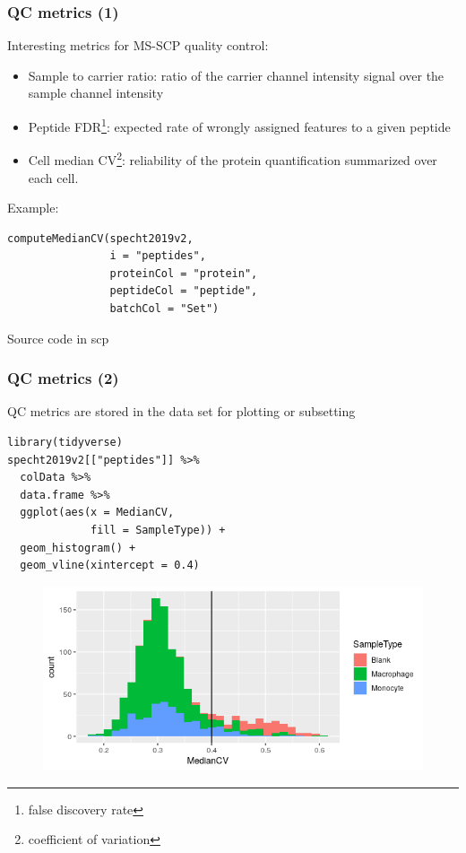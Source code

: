 \documentclass{beamer}
\newcommand{\hcode}[2][lgray]{{\ttfamily\color{vdgray}\colorbox{#1}{#2}}}
\newcommand{\frametitlesection}[1]{\frametitle{\centering #1 \footnotesize \hspace{0pt plus 1 filll} \insertsection}}
\begin{document}
\begin{frame}[fragile]
    \frametitlesection{QC metrics (1)}
    \small
    Interesting metrics for MS-SCP quality control: 
    
    \begin{itemize}
        \item{Sample to carrier ratio}: ratio of the carrier channel intensity 
        signal over the sample channel intensity
        \item{Peptide FDR\footnote{false discovery rate}: expected rate of 
        wrongly assigned features to a given peptide}
        \item{Cell median CV\footnote{coefficient of variation}: reliability of 
        the protein quantification summarized over each cell.}
    \end{itemize}
    
    Example:

    \begin{lstlisting}
computeMedianCV(specht2019v2,
                i = "peptides", 
                proteinCol = "protein", 
                peptideCol = "peptide", 
                batchCol = "Set")
    \end{lstlisting}
    
    Source code in \hcode{scp}
    
\end{frame}


\begin{frame}[fragile]
    \frametitlesection{QC metrics (2)}

    QC metrics are stored in the data set for plotting or subsetting
    
    \begin{lstlisting}[basicstyle = \scriptsize\ttfamily\color{vdgray}]
library(tidyverse)
specht2019v2[["peptides"]] %>%
  colData %>%
  data.frame %>%
  ggplot(aes(x = MedianCV, 
             fill = SampleType)) +
  geom_histogram() +
  geom_vline(xintercept = 0.4)
    \end{lstlisting}
    
    \begin{figure}
        \centering
        \includegraphics[width=.7\linewidth]{figs/medianCV.png}
    \end{figure}
\end{frame}
\end{document}
